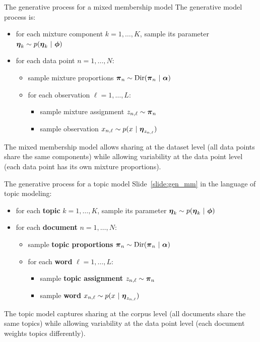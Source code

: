 \documentclass[aspectratio=169]{beamer}
\begin{document}
\begin{frame}{The generative process for a mixed membership model}
\label{slide:gen_mm}
The generative model process is:
\begin{itemize}
    \item for each mixture component $k = 1, \ldots, K$, sample its parameter $\boldsymbol{\eta}_k \sim p(\boldsymbol{\eta}_k ~\vert~ \boldsymbol{\phi})$
    \item for each data point $n=1,\ldots, N$:
    \begin{itemize}
        \item sample mixture proportions $\boldsymbol{\pi}_n \sim \mathrm{Dir}(\boldsymbol{\pi}_n ~\vert~ \boldsymbol{\alpha})$ 
        \item for each observation $\ell = 1, \ldots, L$:
        \begin{itemize}
            \item sample mixture assignment $z_{n,\ell} \sim \boldsymbol{\pi}_n$ 
            \item sample observation $x_{n, \ell} \sim p(x ~\vert~ \boldsymbol{\eta}_{z_{n,\ell}})$
        \end{itemize}
    \end{itemize}
\end{itemize}
The mixed membership model allows sharing at the dataset level (all data points share the same components) while allowing variability at the data point level (each data point has its own mixture proportions).

\end{frame}

\begin{frame}{The generative process for a topic model}
Slide~\ref{slide:gen_mm} in the language of topic modeling: 
\begin{itemize}
    \item for each \textbf{topic} $k = 1, \ldots, K$, sample its parameter $\boldsymbol{\eta}_k \sim p(\boldsymbol{\eta}_k ~\vert~ \boldsymbol{\phi})$
    \item for each \textbf{document} $n=1,\ldots, N$:
    \begin{itemize}
        \item sample \textbf{topic proportions} $\boldsymbol{\pi}_n \sim \mathrm{Dir}(\boldsymbol{\pi}_n ~\vert~ \boldsymbol{\alpha})$ 
        \item for each \textbf{word} $\ell = 1, \ldots, L$:
        \begin{itemize}
            \item sample \textbf{topic assignment} $z_{n,\ell} \sim \boldsymbol{\pi}_n$ 
            \item sample \textbf{word} $x_{n, \ell} \sim p(x ~\vert~ \boldsymbol{\eta}_{z_{n,\ell}})$
        \end{itemize}
    \end{itemize}
\end{itemize}
The topic model captures sharing at the corpus level (all documents share the same topics) while allowing variability at the data point level (each document weights topics differently).

\end{frame}
\end{document}
